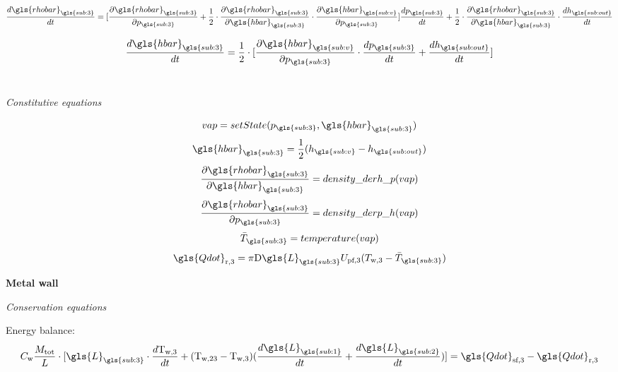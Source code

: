 \documentclass[11pt]{article} %
\begin{document}
\begin{equation}
\frac{d \gls{rhobar}_{\gls{sub:3}}}{d t} = [ \frac{\partial \gls{rhobar}_{\gls{sub:3}}}{\partial p_{\gls{sub:3}}} + \frac{1}{2} \cdot \frac{\partial \gls{rhobar}_{\gls{sub:3}}}{\partial \gls{hbar}_{\gls{sub:3}}} \cdot \frac{\partial \gls{hbar}_{\gls{sub:v}}}{\partial p_{\gls{sub:3}}}] \frac{d p_{\gls{sub:3}}}{d t} + \frac{1}{2} \cdot \frac{\partial \gls{rhobar}_{\gls{sub:3}}}{\partial \gls{hbar}_{\gls{sub:3}}}  \cdot \frac{d h_{\gls{sub:out}}}{d t}
\end{equation}


\begin{equation}
\frac{d \gls{hbar}_{\gls{sub:3}}}{d t} = \frac{1}{2} \cdot [\frac{\partial \gls{hbar}_{\gls{sub:v}}}{\partial p_{\gls{sub:3}}} \cdot \frac{d p_{\gls{sub:3}}}{d t} + \frac{d h_{\gls{sub:out}}}{d t}]
\end{equation}\\

\begin{center}
\textit{Constitutive equations}\\
\end{center}

\begin{equation}
vap = setState(p_{\gls{sub:3}},\gls{hbar}_{\gls{sub:3}})
\end{equation}
\begin{equation}
\gls{hbar}_{\gls{sub:3}} = \frac{1}{2}(h_{\gls{sub:v}} - h_{\gls{sub:out}})
\end{equation}
\begin{equation}
\frac{\partial \gls{rhobar}_{\gls{sub:3}}}{\partial \gls{hbar}_{\gls{sub:3}}}= density\_derh\_p(vap)
\end{equation}
\begin{equation}
\frac{\partial \gls{rhobar}_{\gls{sub:3}}}{\partial p_{\gls{sub:3}}}= density\_derp\_h(vap)
\end{equation}
\begin{equation}
\bar{T}_{\gls{sub:3}} = temperature(vap)
\end{equation}
\begin{equation}
\gls{Qdot}_\text{r,3} = \pi \text{D} \gls{L}_{\gls{sub:3}} U_\text{pf,3} (T_\text{w,3} - \bar{T}_{\gls{sub:3}})
\end{equation}

{\bf Metal wall}\\
\begin{center}
\textit{Conservation equations}
\end{center}
Energy balance:
\begin{equation}
C_\text{w}\frac{M_\text{tot}}{L} \cdot [ \gls{L}_{\gls{sub:3}} \cdot  \frac{d \text{T}_\text{w,3}}{d t} + (\text{T}_\text{w,23} - \text{T}_\text{w,3})  (\frac{d \gls{L}_{\gls{sub:1}}}{d t} + \frac{d \gls{L}_{\gls{sub:2}}}{d t})]= \gls{Qdot}_\text{sf,3} - \gls{Qdot}_\text{r,3}
\end{equation}
\end{document}
